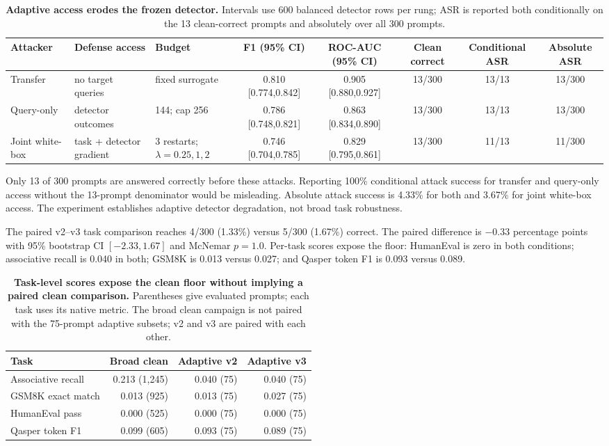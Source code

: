 \documentclass[sigconf]{acmart}
\begin{document}
\begin{table}[t]
\caption{\textbf{Adaptive access erodes the frozen detector.} Intervals use 600
balanced detector rows per rung; ASR is reported both conditionally on the 13
clean-correct prompts and absolutely over all 300 prompts.}
\label{tab:adaptive}
\centering\small
\begin{tabularx}{\textwidth}{@{}lYYccccc@{}}
\toprule
Attacker & Defense access & Budget & F1 (95\% CI) & ROC-AUC (95\% CI) & Clean correct & Conditional ASR & Absolute ASR \\
\midrule
Transfer & no target queries & fixed surrogate & 0.810 [0.774,0.842] & 0.905 [0.880,0.927] & 13/300 & 13/13 & 13/300 \\
Query-only & detector outcomes & 144; cap 256 & 0.786 [0.748,0.821] & 0.863 [0.834,0.890] & 13/300 & 13/13 & 13/300 \\
Joint white-box & task + detector gradient & 3 restarts; $\lambda=0.25,1,2$ & 0.746 [0.704,0.785] & 0.829 [0.795,0.861] & 13/300 & 11/13 & 11/300 \\
\bottomrule
\end{tabularx}
\end{table}

Only 13 of 300 prompts are answered correctly before these attacks. Reporting
100\% conditional attack success for transfer and query-only access without the
13-prompt denominator would be misleading. Absolute attack success is 4.33\%
for both and 3.67\% for joint white-box access. The experiment establishes
adaptive detector degradation, not broad task robustness.

The paired v2--v3 task comparison reaches 4/300 (1.33\%) versus 5/300 (1.67\%)
correct. The paired difference is $-0.33$ percentage points with 95\% bootstrap
CI $[-2.33,1.67]$ and McNemar $p=1.0$. Per-task scores expose the floor:
HumanEval is zero in both conditions; associative recall is 0.040 in both;
GSM8K is 0.013 versus 0.027; and Qasper token F1 is 0.093 versus 0.089.

\begin{table}[t]
\caption{\textbf{Task-level scores expose the clean floor without implying a
paired clean comparison.} Parentheses give evaluated prompts; each task uses
its native metric. The broad clean campaign is not paired with the 75-prompt
adaptive subsets; v2 and v3 are paired with each other.}
\label{tab:utility}
\centering\small
\begin{tabularx}{\columnwidth}{@{}Yrrr@{}}
\toprule
Task & Broad clean & Adaptive v2 & Adaptive v3 \\
\midrule
Associative recall & 0.213 (1,245) & 0.040 (75) & 0.040 (75) \\
GSM8K exact match & 0.013 (925) & 0.013 (75) & 0.027 (75) \\
HumanEval pass & 0.000 (525) & 0.000 (75) & 0.000 (75) \\
Qasper token F1 & 0.099 (605) & 0.093 (75) & 0.089 (75) \\
\bottomrule
\end{tabularx}
\end{table}
\end{document}
